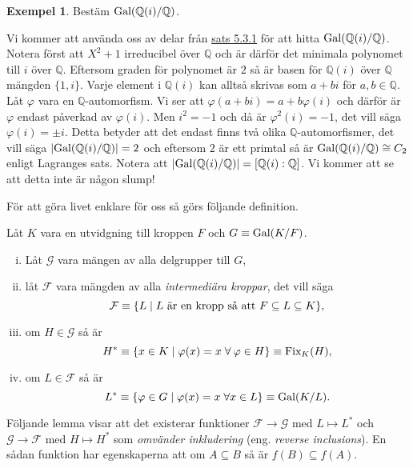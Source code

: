 \documentclass{article}
\newcommand{\gal}[0]{\textnormal{Gal}}
\newcommand{\fix}[0]{\textnormal{Fix}}
\theoremstyle{definition}
\newtheorem{exmp}[thm]{Exempel}
\begin{document}
\begin{exmp}
  Bestäm $\gal(\mathbb{Q}(i)/\mathbb{Q})$.
\end{exmp}

Vi kommer att använda oss av delar från \hyperlink{minpol}{sats 5.3.1} för att hitta $\gal(\mathbb{Q}(i)/\mathbb{Q})$. 
Notera först att $X^2 + 1$ irreducibel över $\mathbb{Q}$ och är därför det minimala polynomet till $i$ över $\mathbb{Q}$.
Eftersom graden för polynomet är $2$ så är basen för $\mathbb{Q}(i)$ över $\mathbb{Q}$ mängden $\{1, i\}$. Varje element i $\mathbb{Q}(i)$
kan alltså skrivas som $a + bi$ för $a, b \in \mathbb{Q}$. Låt $\varphi$ vara en $\mathbb{Q}$-automorfism. Vi ser att $\varphi(a + bi) = a + b\varphi(i)$
och därför är $\varphi$ endast påverkad av $\varphi(i)$. Men $i^2 = -1$ och då är $\varphi^2(i) = -1$, det vill säga $\varphi(i) = \pm i.$
Detta betyder att det endast finns två olika $\mathbb{Q}$-automorfismer, det vill säga $|\gal(\mathbb{Q}(i)/\mathbb{Q})| = 2$
och eftersom $2$ är ett primtal så är $\gal(\mathbb{Q}(i)/\mathbb{Q}) \cong C_2$ enligt Lagranges sats. Notera att 
$|\gal(\mathbb{Q}(i)/\mathbb{Q})| = [\mathbb{Q}(i) : \mathbb{Q}]$. Vi kommer att se att detta inte är någon slump!

För att göra livet enklare för oss så görs följande definition.
\begin{mydef}{}{}
  Låt $K$ vara en utvidgning till kroppen $F$ och $G \equiv \gal(K/F)$. 
  \begin{enumerate}[(i)]
    \item Låt $\mathcal{G}$ vara mängen av alla delgrupper till $G$, 
    \item låt $\mathcal{F}$ vara mängden av alla \textit{intermediära kroppar}, det vill säga 
    \[ \mathcal{F} \equiv \{L \; | \; L \textnormal{ är en kropp så att } F \subseteq L \subseteq K\}, \]
    \item om $H \in \mathcal{G}$ så är 
    \[ H^* \equiv \{ x \in K \; | \; \varphi(x) = x \; \forall \: \varphi  \in H \} \equiv \fix_K(H), \]
    \item om $L \in \mathcal{F}$  så är 
    \[ L^* \equiv \{ \varphi \in G \; | \; \varphi(x) = x \; \forall x \in L \} \equiv \gal(K/L). \]
  \end{enumerate}
\end{mydef}
Följande lemma visar att det existerar funktioner $\mathcal{F} \rightarrow \mathcal{G}$ med $L \mapsto L^*$ och
$\mathcal{G} \rightarrow \mathcal{F}$ med $H \mapsto H^*$ som \textit{omvänder inkludering} (eng. \textit{reverse inclusions}). En sådan funktion 
har egenskaperna att om $A \subseteq B$ så är $f(B) \subseteq f(A)$.
\end{document}
